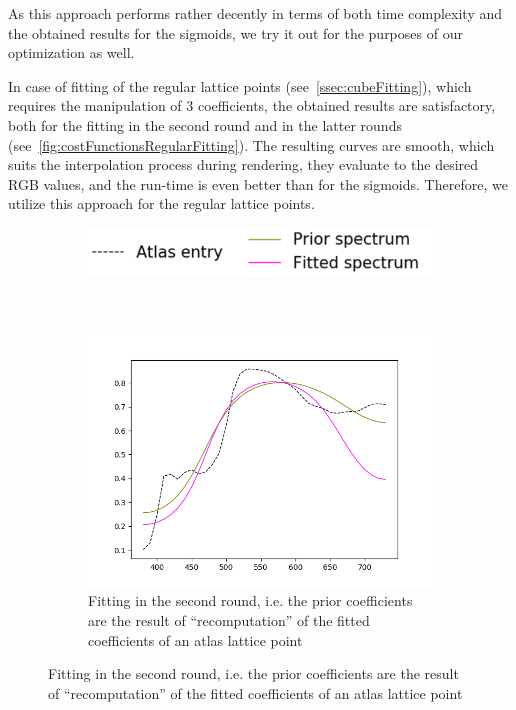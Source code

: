 As this approach performs rather decently in terms of both time complexity and the obtained results for the sigmoids, we try it out for the purposes of our optimization as well. 

In case of fitting of the regular lattice points (see~\cref{ssec:cubeFitting}), which requires the manipulation of 3 coefficients, the obtained results are satisfactory, both for the fitting in the second round and in the latter rounds (see~\cref{fig:costFunctionsRegularFitting}). The resulting curves are smooth, which suits the interpolation process during rendering, they evaluate to the desired RGB values, and the run-time is even better than for the sigmoids. Therefore, we utilize this approach for the regular lattice points.

\begin{figure}[t]
	\centering
	\begin{subfigure}[t]{0.4\textwidth}
		\includegraphics[width=\linewidth]{img/cost_functions_regular_legend.png}
	\end{subfigure} \\
	\begin{subfigure}[t]{0.45\textwidth}
	\includegraphics[width=\linewidth]{img/cost_functions_regular_round2.png}
	\caption{Fitting in the second round, i.e. the prior coefficients are the result of ``recomputation'' of the fitted coefficients of an atlas lattice point}

\end{subfigure}
\end{figure}

